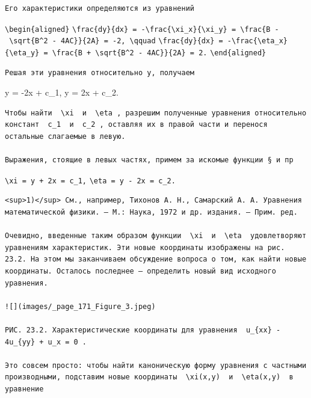 \documentclass[
  ukrainian,
]{article}
\begin{document}
\begin{verbatim}
Его характеристики определяются из уравнений
\end{verbatim}

\texttt{\textbackslash{}begin\{aligned\}}
\texttt{\textbackslash{}frac\{dy\}\{dx\}\ =\ -\textbackslash{}frac\{\textbackslash{}xi\_x\}\{\textbackslash{}xi\_y\}\ =\ \textbackslash{}frac\{B\ -\ \textbackslash{}sqrt\{B\^{}2\ -\ 4AC\}\}\{2A\}\ =\ -2,\ \textbackslash{}qquad}
\texttt{\textbackslash{}frac\{dy\}\{dx\}\ =\ -\textbackslash{}frac\{\textbackslash{}eta\_x\}\{\textbackslash{}eta\_y\}\ =\ \textbackslash{}frac\{B\ +\ \textbackslash{}sqrt\{B\^{}2\ -\ 4AC\}\}\{2A\}\ =\ 2.}
\texttt{\textbackslash{}end\{aligned\}}

\begin{verbatim}
Решая эти уравнения относительно у, получаем
\end{verbatim}

y = -2x + c\_1, y = 2x + c\_2.

\begin{verbatim}
Чтобы найти  \xi  и  \eta , разрешим полученные уравнения относительно констант  c_1  и  c_2 , оставляя их в правой части и перенося остальные слагаемые в левую.

Выражения, стоящие в левых частях, примем за искомые функции § и пр
\end{verbatim}

\texttt{\textbackslash{}xi\ =\ y\ +\ 2x\ =\ c\_1,}
\texttt{\textbackslash{}eta\ =\ y\ -\ 2x\ =\ c\_2.}

\begin{verbatim}
<sup>1)</sup> См., например, Тихонов А. Н., Самарский А. А. Уравнения математической физики. — М.: Наука, 1972 и др. издания. — Прим. ред.

Очевидно, введенные таким образом функции  \xi  и  \eta  удовлетворяют уравнениям характеристик. Эти новые координаты изображены на рис. 23.2. На этом мы заканчиваем обсуждение вопроса о том, как найти новые координаты. Осталось последнее — определить новый вид исходного уравнения.

![](images/_page_171_Figure_3.jpeg)

РИС. 23.2. Характеристические координаты для уравнения  u_{xx} - 4u_{yy} + u_x = 0 .

Это совсем просто: чтобы найти каноническую форму уравнения с частными производными, подставим новые координаты  \xi(x,y)  и  \eta(x,y)  в уравнение
\end{verbatim}
\end{document}
